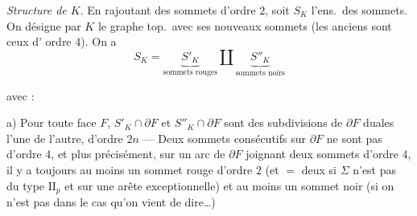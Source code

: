 \documentclass[11pt,a4paper]{article}
\begin{document}

\emph{Structure de $K$}. En rajoutant des sommets d'ordre $2$, soit $S_K$ l'ens.\ des sommets. On désigne par $K$ le graphe top.\ avec ses nouveaux sommets (les anciens sont ceux d'\struck{\ill{}} ordre $4$). On a
\[
S_K = \underbrace{S'_K}_{\text{sommets rouges}} \amalg \underbrace{S''_K}_{\text{sommets noirs}}
\]

avec :

a) Pour toute face $F$, $S'_K \cap \partial F$ et $S''_K \cap \partial F$ sont des subdivisions de $\partial F$ duales l'une de l'autre, d'ordre $2n$
 --- Deux sommets consécutifs sur $\partial F$ ne sont pas d'ordre $4$, et plus précisément,  sur un arc de $\partial F$ joignant deux sommets d'ordre $4$, il y a toujours au moins un sommet rouge d'ordre $2$ (et $=$ deux si $\Sigma$ n'est pas \struck{\ill{}} du type $\mathrm{II}_p$ et  sur une arête exceptionnelle) et au moins un sommet noir (si on n'est  pas dans le cas qu'on vient de dire\ldots)
\end{document}
